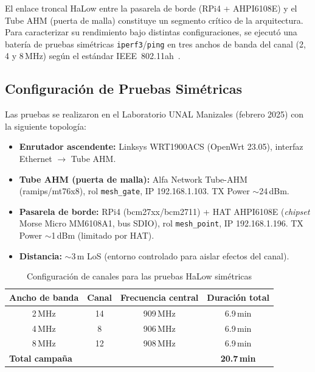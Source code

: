 El enlace troncal HaLow entre la pasarela de borde (RPi4 + AHPI6108E) y el Tube AHM (puerta de malla) constituye un segmento crítico de la arquitectura. Para caracterizar su rendimiento bajo distintas configuraciones, se ejecutó una batería de pruebas simétricas \texttt{iperf3}/\texttt{ping} en tres anchos de banda del canal (2, 4 y 8\,MHz) según el estándar IEEE~802.11ah~\cite{tianWiFiHaLowInternet2021,leeWiFiHaLowLongRange2021}.

\subsection{Configuración de Pruebas Simétricas}
\label{sec:resultados-halow-config}

Las pruebas se realizaron en el Laboratorio UNAL Manizales (febrero 2025) con la siguiente topología:

\begin{itemize}
    \item \textbf{Enrutador ascendente:} Linksys WRT1900ACS (OpenWrt 23.05), interfaz Ethernet $\rightarrow$ Tube AHM.
    \item \textbf{Tube AHM (puerta de malla):} Alfa Network Tube-AHM (ramips/mt76x8), rol \texttt{mesh\_gate}, IP 192.168.1.103. TX Power $\sim$24\,dBm.
    \item \textbf{Pasarela de borde:} RPi4 (bcm27xx/bcm2711) + HAT AHPI6108E (\emph{chipset} Morse Micro MM6108A1, bus SDIO), rol \texttt{mesh\_point}, IP 192.168.1.196. TX Power $\sim$1\,dBm (limitado por HAT).
    \item \textbf{Distancia:} $\sim$3\,m LoS (entorno controlado para aislar efectos del canal).
\end{itemize}

\begin{table}[H]
\centering
\caption{Configuración de canales para las pruebas HaLow simétricas}
\label{tab:halow-channel-config}
\small
\begin{tabular}{cccc}
\toprule
\textbf{Ancho de banda} & \textbf{Canal} & \textbf{Frecuencia central} & \textbf{Duración total} \\
\midrule
2\,MHz & 14 & 909\,MHz & 6.9\,min \\
4\,MHz & 8 & 906\,MHz & 6.9\,min \\
8\,MHz & 12 & 908\,MHz & 6.9\,min \\
\midrule
\multicolumn{3}{l}{\textbf{Total campaña}} & \textbf{20.7\,min} \\
\bottomrule
\end{tabular}
\end{table}

